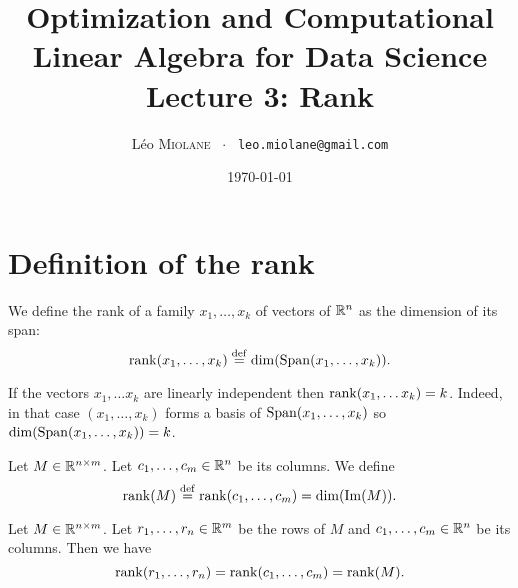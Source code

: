 \documentclass[11pt,nocut]{article}
\title{\vspace{-2.0cm}%
	Optimization and Computational Linear Algebra for Data Science\\
	Lecture 3: Rank}
\author{Léo \textsc{Miolane} \ $\cdot$ \ \texttt{leo.miolane@gmail.com}}
\date{\today}
\begin{document}
\maketitle



\section{Definition of the rank}

\begin{definition}
	We define the rank of a family $x_1, \dots, x_k$ of vectors of $\mathbb{R}^n$ as the dimension of its span:
	$$
	{{\rm rank}}(x_1, \dots, x_k) \overset{\rm def}{=} {{\rm dim}} ({{\rm Span}}(x_1, \dots, x_k)).
	$$
\end{definition}

If the vectors $x_1, \dots x_k$ are linearly independent then ${{\rm rank}}(x_1, \dots x_k) = k$. Indeed, in that case $(x_1, \dots, x_k)$ forms a basis of ${{\rm Span}}(x_1, \dots, x_k)$ so ${{\rm dim}}({{\rm Span}}(x_1, \dots, x_k)) = k$.


\begin{definition}\label{def:rank}
	Let $M \in \mathbb{R}^{n \times m}$. Let $c_1, \dots, c_m \in \mathbb{R}^n$ be its columns.
	We define
	\begin{equation}\label{eq:rank}
		{{\rm rank}}(M) \overset{\rm def}{=} {{\rm rank}}(c_1, \dots, c_m) = {{\rm dim}}({{\rm Im}}(M)).
	\end{equation}
\end{definition}

\begin{proposition}\label{prop:rank}
	Let $M \in \mathbb{R}^{n \times m}$. Let $r_1, \dots, r_n \in \mathbb{R}^m$ be the rows of $M$ and $c_1, \dots, c_m \in \mathbb{R}^n$ be its columns.
	Then we have
	\begin{equation}\label{eq:rank}
		{{\rm rank}}(r_1, \dots, r_n) = {{\rm rank}}(c_1, \dots, c_m) = {{\rm rank}}(M).
	\end{equation}
\end{proposition}
\end{document}
